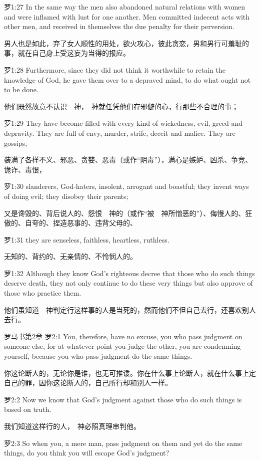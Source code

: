 \documentclass[a4paper,11pt,onecolumn,twoside]{ctexart}
\begin{document}
\begin{multicols}{2}
 罗1:27
 In the same way the men also abandoned natural relations with women and were inflamed with lust for one another. Men committed indecent acts with other men, and received in themselves the due penalty for their perversion.

 男人也是如此，弃了女人顺性的用处，欲火攻心，彼此贪恋，男和男行可羞耻的事，就在自己身上受这妄为当得的报应。


 罗1:28
 Furthermore, since they did not think it worthwhile to retain the knowledge of God, he gave them over to a depraved mind, to do what ought not to be done.

 他们既然故意不认识　神，　神就任凭他们存邪僻的心，行那些不合理的事；


 罗1:29
 They have become filled with every kind of wickedness, evil, greed and depravity. They are full of envy, murder, strife, deceit and malice. They are gossips,

 装满了各样不义、邪恶、贪婪、恶毒（或作“阴毒”），满心是嫉妒、凶杀、争竞、诡诈、毒恨，


 罗1:30
 slanderers, God-haters, insolent, arrogant and boastful; they invent ways of doing evil; they disobey their parents;

 又是谗毁的、背后说人的、怨恨　神的（或作“被　神所憎恶的”）、侮慢人的、狂傲的、自夸的、捏造恶事的、违背父母的、


 罗1:31
 they are senseless, faithless, heartless, ruthless.

 无知的、背约的、无亲情的、不怜悯人的。


 罗1:32
 Although they know God's righteous decree that those who do such things deserve death, they not only continue to do these very things but also approve of those who practice them.

 他们虽知道　神判定行这样事的人是当死的，然而他们不但自己去行，还喜欢别人去行。


 罗马书第2章
 罗2:1
 You, therefore, have no excuse, you who pass judgment on someone else, for at whatever point you judge the other, you are condemning yourself, because you who pass judgment do the same things.

 你这论断人的，无论你是谁，也无可推诿。你在什么事上论断人，就在什么事上定自己的罪，因你这论断人的，自己所行却和别人一样。


 罗2:2
 Now we know that God's judgment against those who do such things is based on truth.

 我们知道这样行的人，　神必照真理审判他。


 罗2:3
 So when you, a mere man, pass judgment on them and yet do the same things, do you think you will escape God's judgment?


\end{multicols}
\end{document}
